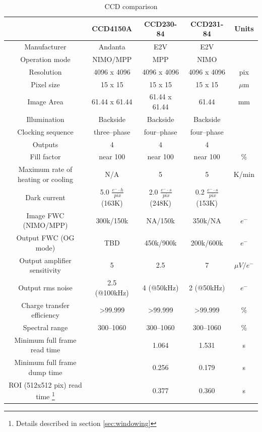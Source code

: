 \begin{savenotes}
\begin{table}[!htbp]
\centering
\caption{CCD comparison}
\label{tab:CCD}
\begin{tabular}{|c|c|c|c|c|}
\hline
 & CCD4150A & CCD230-84 & CCD231-84 & Units \\ \hline
Manufacturer & Andanta & E2V & E2V & \\ \hline
Operation mode & NIMO/MPP & MPP & NIMO & \\ \hline
Resolution &4096 x 4096 & 4096 x 4096  & 4096 x 4096 & pix \\ \hline
Pixel size & 15 x 15 & 15 x 15  & 15 x 15 & $\mu$m \\ \hline
Image Area &61.44 x 61.44& 61.44 x 61.44 & 61.44 & mm \\ \hline
Illumination & Backside & Backside & Backside &  \\ \hline
Clocking sequence & three--phase& four--phase & four--phase &  \\ \hline
Outputs &4& 4 &4 &  \\ \hline
Fill factor &near 100& near 100 &  near 100 & \% \\ \hline
Maximum rate of heating or cooling & N/A & 5 & 5 & K/min \\ \hline
Dark current & 5.0 $\frac{e^{-}\cdot h}{pix}$ (163K) &2.0 $\frac{e^{-}\cdot s}{pix}$ (248K)&  0.2 $\frac{e^{-}\cdot s}{pix}$ (153K) & \\ \hline
Image FWC (NIMO/MPP)  & 300k/150k &  NA/150k & 350k/NA  & $e^{-}$ \\ \hline
Output FWC (OG mode)  & TBD  & 450k/900k & 200k/600k & $e^{-}$ \\ \hline
Output amplifier sensitivity & 5 & 2.5 & 7 & $\mu V/e^{-}$ \\ \hline
Output rms noise  & 2.5 (@100kHz)  & 4 (@50kHz) & 2 (@50kHz) & $ e^{-}$ \\ \hline
Charge transfer efficiency & >99.999 &  >99.999 &  >99.999 & \% \\ \hline
Spectral range & 300--1060 & 300--1060 & 300--1060 & \% \\ \hline
Minimum full frame read time & & 1.064 & 1.531 & s\\ \hline
Minimum full frame dump time &  & 0.256 & 0.179 & s\\ \hline
ROI (512x512 pix) read time \footnote{Details described in section \ref{sec:windowing}} & & 0.377 & 0.360 & s\\ \hline
\end{tabular}
\end{table}
\end{savenotes}

